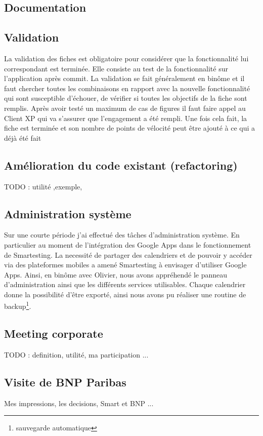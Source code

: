 \documentclass[12pt,oneside]{book}
\begin{document}
\subsection{Documentation}

\subsection{Validation}
La validation des fiches est obligatoire pour considérer que la fonctionnalité lui correspondant est terminée. Elle consiste au test de la fonctionnalité sur l'application après commit. La validation se fait généralement en binôme et il faut chercher toutes les combinaisons en rapport avec la nouvelle fonctionnalité qui sont susceptible d'échouer, de vérifier si toutes les objectifs de la fiche sont remplis. Après avoir testé un maximum de cas de figures il faut faire appel au Client XP qui va s'assurer que l'engagement a été rempli. Une fois cela fait, la fiche est terminée et son nombre de points de vélocité peut être ajouté à ce qui a déjà été fait
\subsection{Amélioration du code existant (refactoring)}
TODO : utilité ,exemple, 
\subsection{Administration système}
Sur une courte période j'ai effectué des t\^aches d'administration système. En particulier au moment de l'intégration des Google Apps dans le fonctionnement de Smartesting. La necessité de partager des calendriers et de pouvoir y accéder via des plateformes mobiles a amené Smartesting à envisager d'utiliser Google Apps. Ainsi, en binôme avec Olivier, nous avons appréhendé le panneau d'administration ainsi que les différents services utilisables. Chaque calendrier donne la possibilité d'être exporté, ainsi nous avons pu réaliser une routine de backup\footnote{sauvegarde automatique}.
\subsection{Meeting corporate}
TODO : definition, utilité, ma participation ...
\subsection{Visite de BNP Paribas}
Mes impressions, les decisions, Smart et BNP ...
\end{document}
